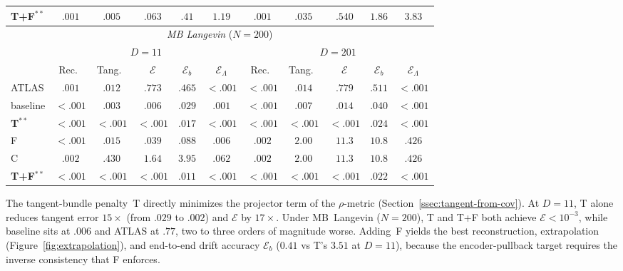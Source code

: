 \documentclass[11pt]{article}
\newcommand{\cE}{\mathcal{E}}
\begin{document}
\begin{table}[ht]
\begin{tabular}{l ccccc ccccc}
\textbf{T+F}$^{**}$ & $.001$ & $.005$ & $.063$ & $.41$ & $\mathbf{1.19}$
         & $.001$ & $.035$ & $.540$ & $1.86$ & $3.83$ \\
\midrule
\multicolumn{11}{c}{\emph{MB Langevin} ($N{=}200$)} \\
\cmidrule(lr){1-11}
 & \multicolumn{5}{c}{$D{=}11$} & \multicolumn{5}{c}{$D{=}201$} \\
\cmidrule(lr){2-6} \cmidrule(lr){7-11}
 & Rec.\ & Tang.\ & $\cE$ & $\cE_b$ & $\cE_\Lambda$
 & Rec.\ & Tang.\ & $\cE$ & $\cE_b$ & $\cE_\Lambda$ \\
\midrule
ATLAS    & $.001$ & $.012$ & $.773$ & $.465$ & ${\scriptstyle <}.001$
         & ${\scriptstyle <}.001$ & $.014$ & $.779$ & $.511$ & ${\scriptstyle <}.001$ \\
baseline & ${\scriptstyle <}.001$ & $.003$ & $.006$ & $.029$ & $.001$
         & ${\scriptstyle <}.001$ & $.007$ & $.014$ & $.040$ & ${\scriptstyle <}.001$ \\
\textbf{T}$^{**}$ & $\mathbf{{\scriptstyle <}.001}$ & $\mathbf{{\scriptstyle <}.001}$ & $\mathbf{{\scriptstyle <}.001}$ & $.017$ & $\mathbf{{\scriptstyle <}.001}$
         & $\mathbf{{\scriptstyle <}.001}$ & $\mathbf{{\scriptstyle <}.001}$ & $\mathbf{{\scriptstyle <}.001}$ & $.024$ & $\mathbf{{\scriptstyle <}.001}$ \\
F        & ${\scriptstyle <}.001$ & $.015$ & $.039$ & $.088$ & $.006$
         & $.002$ & $2.00$ & $11.3$ & $10.8$ & $.426$ \\
C        & $.002$ & $.430$ & $1.64$ & $3.95$ & $.062$
         & $.002$ & $2.00$ & $11.3$ & $10.8$ & $.426$ \\
\textbf{T+F}$^{**}$ & $\mathbf{{\scriptstyle <}.001}$ & $\mathbf{{\scriptstyle <}.001}$ & $\mathbf{{\scriptstyle <}.001}$ & $\mathbf{.011}$ & $\mathbf{{\scriptstyle <}.001}$
         & $\mathbf{{\scriptstyle <}.001}$ & $\mathbf{{\scriptstyle <}.001}$ & $\mathbf{{\scriptstyle <}.001}$ & $\mathbf{.022}$ & $\mathbf{{\scriptstyle <}.001}$ \\
\bottomrule
\end{tabular}
\end{table}

The tangent-bundle penalty~T directly minimizes the
projector term of the $\rho$-metric
(Section~\ref{ssec:tangent-from-cov}).
At $D{=}11$, T alone reduces tangent error $15{\times}$
(from $.029$ to $.002$) and $\cE$ by $17{\times}$.
Under MB~Langevin ($N{=}200$), T and T+F both achieve
$\cE < 10^{-3}$, while baseline sits at $.006$ and
ATLAS at $.77$, two to three orders of magnitude worse.
Adding~F yields the best reconstruction, extrapolation
(Figure~\ref{fig:extrapolation}), and end-to-end drift
accuracy $\cE_b$ ($0.41$ vs T's $3.51$ at $D{=}11$),
because the encoder-pullback target requires the
inverse consistency that F enforces.
\end{document}
